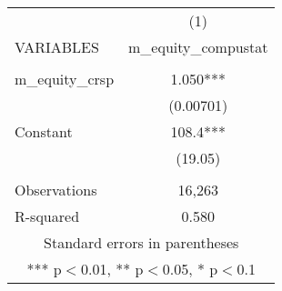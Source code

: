 \begin{tabular}{lc} \hline
 & (1) \\
VARIABLES & m\_equity\_compustat \\ \hline
 &  \\
m\_equity\_crsp & 1.050*** \\
 & (0.00701) \\
Constant & 108.4*** \\
 & (19.05) \\
 &  \\
Observations & 16,263 \\
 R-squared & 0.580 \\ \hline
\multicolumn{2}{c}{ Standard errors in parentheses} \\
\multicolumn{2}{c}{ *** p$<$0.01, ** p$<$0.05, * p$<$0.1} \\
\end{tabular}
